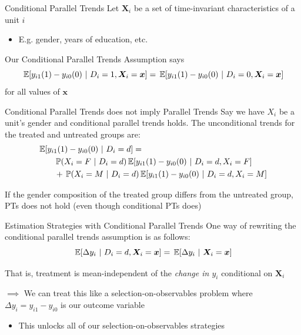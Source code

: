 \documentclass[aspectratio=169,t,11pt,table]{beamer}
\begin{document}
\begin{frame}{Conditional Parallel Trends}
  Let $\bm{X}_i$ be a set of time-invariant characteristics of a unit $i$
  \begin{itemize}
    \item E.g. gender, years of education, etc.
  \end{itemize}

  \bigskip
  Our \alert{Conditional Parallel Trends} Assumption says
  $$
    \expec{y_{i1}(1) - y_{i0}(0)}{D_i = 1, \bm{X}_i = \bm{x}} = 
    \expec{y_{i1}(1) - y_{i0}(0)}{D_i = 0, \bm{X}_i = \bm{x}}
  $$
  for all values of $\bm{x}$ 
\end{frame}

\begin{frame}{Conditional Parallel Trends does not imply Parallel Trends}
  Say we have $X_i$ be a unit's gender and conditional parallel trends holds. The unconditional trends for the treated and untreated groups are:
  \begin{align*}
    &\expec{y_{i1}(1) - y_{i0}(0)}{D_i = d} =\\
    &\quad\quad \prob{X_i = F}{D_i = d} \expec{y_{i1}(1) - y_{i0}(0)}{D_i = d, X_i = F} \\
    &\quad\quad+ \prob{X_i = M}{D_i = d} \expec{y_{i1}(1) - y_{i0}(0)}{D_i = d, X_i = M} 
  \end{align*}

  \pause
  \bigskip
  If the gender composition of the treated group differs from the untreated group, PTs does not hold (even though conditional PTs does)
\end{frame}

\begin{frame}{Estimation Strategies with Conditional Parallel Trends}
  One way of rewriting the conditional parallel trends assumption is as follows:
  $$
    \expec{\Delta y_i}{D_i = d, \bm{X}_i = \bm{x}} = \expec{\Delta y_i}{\bm{X}_i = \bm{x}}
  $$

  That is, treatment is mean-independent of the \emph{change in $y_i$} conditional on $\bm{X}_i$
  
  \pause
  \bigskip
  $\implies$ We can treat this like a selection-on-observables problem where $\Delta y_i = y_{i1} - y_{i0}$ is our outcome variable
  \begin{itemize}
    \item This unlocks all of our selection-on-observables strategies
  \end{itemize}
\end{frame}
\end{document}

